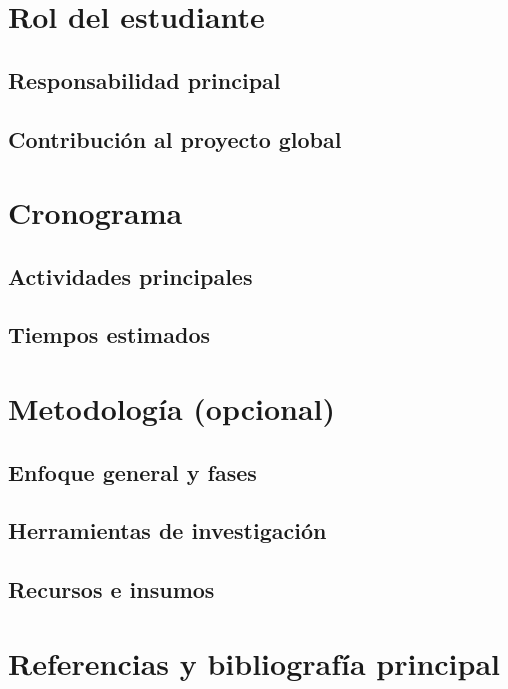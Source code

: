 \section{Rol del estudiante}
\subsection{Responsabilidad principal}
\subsection{Contribución al proyecto global}

\section{Cronograma}
\subsection{Actividades principales}
\subsection{Tiempos estimados}

\section{Metodología (opcional)}
\subsection{Enfoque general y fases}
\subsection{Herramientas de investigación}
\subsection{Recursos e insumos}

\section{Referencias y bibliografía principal}

